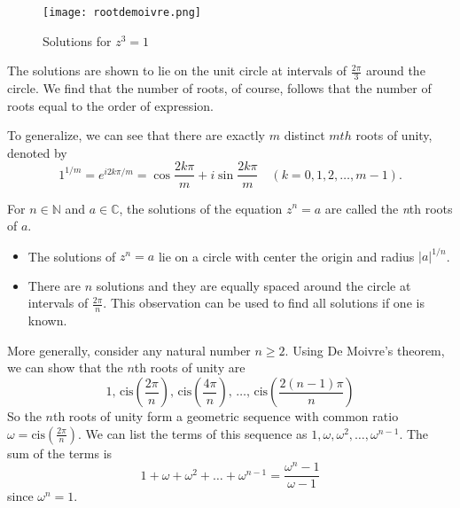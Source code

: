\begin{figure}[h]
    \centering
    \texttt{[image: rootdemoivre.png]}
    \caption{Solutions for $z^3=1$}
\end{figure}
The solutions are shown to lie on the unit circle at intervals of \( \frac{2\pi}{3} \) around the circle.
We find that the number of roots, of course, follows that the number of roots equal to the order of expression.

To generalize, we can see that there are exactly $m$ distinct $mth$ roots of unity, denoted
by
 \begin{equation}
    \boxed{1^{1/m}=e^{i2k\pi/m}=\cos\frac{2k\pi}m+i\sin\frac{2k\pi}m\quad(k=0,1,2, \ldots, m-1).}
 \end{equation}

\begin{theorem}[Solution of \( z^n = a \)] 

    For \( n \in \mathbb{N} \) and \( a \in \mathbb{C} \), the solutions of the equation \( z^n = a \) are called the \textit{n}th roots of \( a \).
\begin{itemize}[leftmargin=*]
    \item The solutions of \( z^n = a \) lie on a circle with center the origin and radius \( |a|^{1/n} \).
    \item There are \( n \) solutions and they are equally spaced around the circle at intervals of \( \frac{2\pi}{n} \). This observation can be used to find all solutions if one is known.
\end{itemize}
\end{theorem}   
More generally, consider any natural number \( n \geq 2 \). Using De Moivre's theorem, we can show that the \( n \)th roots of unity are
\[
1, \, \text{cis}\left(\frac{2\pi}{n}\right), \, \text{cis}\left(\frac{4\pi}{n}\right), \, \ldots, \, \text{cis}\left(\frac{2(n-1)\pi}{n}\right)
\]
So the \( n \)th roots of unity form a geometric sequence with common ratio \( \omega = \text{cis}\left(\frac{2\pi}{n}\right) \).
We can list the terms of this sequence as \( 1, \omega, \omega^2, \ldots, \omega^{n-1} \). The sum of the terms is
\[
1 + \omega + \omega^2 + \ldots + \omega^{n-1} = \frac{\omega^n - 1}{\omega - 1}
\]
since \( \omega^n = 1 \).
